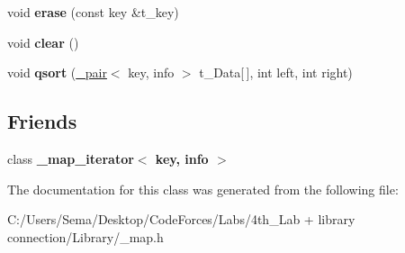 \begin{DoxyCompactItemize}
\item 
\mbox{\label{class__map_a36cc0dfcb7c80a92411cf1fff8c3470c}} 
void {\bfseries erase} (const key \&t\+\_\+key)
\item 
\mbox{\label{class__map_a71a8faeda3104ce0813d225e1f8061c9}} 
void {\bfseries clear} ()
\item 
\mbox{\label{class__map_a5afbabcadd30cb793f247d2c74d16f4b}} 
void {\bfseries qsort} (\mbox{\hyperlink{struct__pair}{\+\_\+pair}}$<$ key, info $>$ t\+\_\+\+Data\mbox{[}$\,$\mbox{]}, int left, int right)
\end{DoxyCompactItemize}
\subsection*{Friends}
\begin{DoxyCompactItemize}
\item 
\mbox{\label{class__map_aee0529ae233dd23abd46a52d05b9fd09}} 
class {\bfseries \+\_\+map\+\_\+iterator$<$ key, info $>$}
\end{DoxyCompactItemize}


The documentation for this class was generated from the following file\+:\begin{DoxyCompactItemize}
\item 
C\+:/\+Users/\+Sema/\+Desktop/\+Code\+Forces/\+Labs/4th\+\_\+\+Lab + library connection/\+Library/\+\_\+map.\+h\end{DoxyCompactItemize}
